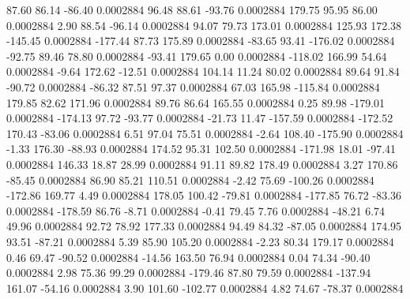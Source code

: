        87.60       86.14      -86.40     0.0002884
       96.48       88.61      -93.76     0.0002884
      179.75       95.95       86.00     0.0002884
        2.90       88.54      -96.14     0.0002884
       94.07       79.73      173.01     0.0002884
      125.93      172.38     -145.45     0.0002884
     -177.44       87.73      175.89     0.0002884
      -83.65       93.41     -176.02     0.0002884
      -92.75       89.46       78.80     0.0002884
      -93.41      179.65        0.00     0.0002884
     -118.02      166.99       54.64     0.0002884
       -9.64      172.62      -12.51     0.0002884
      104.14       11.24       80.02     0.0002884
       89.64       91.84      -90.72     0.0002884
      -86.32       87.51       97.37     0.0002884
       67.03      165.98     -115.84     0.0002884
      179.85       82.62      171.96     0.0002884
       89.76       86.64      165.55     0.0002884
        0.25       89.98     -179.01     0.0002884
     -174.13       97.72      -93.77     0.0002884
      -21.73       11.47     -157.59     0.0002884
     -172.52      170.43      -83.06     0.0002884
        6.51       97.04       75.51     0.0002884
       -2.64      108.40     -175.90     0.0002884
       -1.33      176.30      -88.93     0.0002884
      174.52       95.31      102.50     0.0002884
     -171.98       18.01      -97.41     0.0002884
      146.33       18.87       28.99     0.0002884
       91.11       89.82      178.49     0.0002884
        3.27      170.86      -85.45     0.0002884
       86.90       85.21      110.51     0.0002884
       -2.42       75.69     -100.26     0.0002884
     -172.86      169.77        4.49     0.0002884
      178.05      100.42      -79.81     0.0002884
     -177.85       76.72      -83.36     0.0002884
     -178.59       86.76       -8.71     0.0002884
       -0.41       79.45        7.76     0.0002884
      -48.21        6.74       49.96     0.0002884
       92.72       78.92      177.33     0.0002884
       94.49       84.32      -87.05     0.0002884
      174.95       93.51      -87.21     0.0002884
        5.39       85.90      105.20     0.0002884
       -2.23       80.34      179.17     0.0002884
        0.46       69.47      -90.52     0.0002884
      -14.56      163.50       76.94     0.0002884
        0.04       74.34      -90.40     0.0002884
        2.98       75.36       99.29     0.0002884
     -179.46       87.80       79.59     0.0002884
     -137.94      161.07      -54.16     0.0002884
        3.90      101.60     -102.77     0.0002884
        4.82       74.67      -78.37     0.0002884
